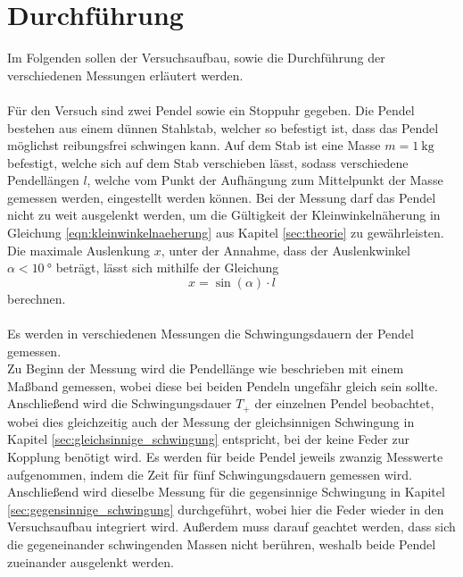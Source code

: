 \section{Durchführung}

    Im Folgenden sollen der Versuchsaufbau, 
    sowie die Durchführung der verschiedenen Messungen erläutert werden.\\
    \\
    Für den Versuch sind zwei Pendel sowie ein Stoppuhr gegeben.
    Die Pendel bestehen aus einem dünnen Stahlstab,
    welcher so befestigt ist,
    dass das Pendel möglichst reibungsfrei schwingen kann.
    Auf dem Stab ist eine Masse $m = \SI{1}{\kilo\gram}$ befestigt,
    welche sich auf dem Stab verschieben lässt,
    sodass verschiedene Pendellängen $l$,
    welche vom Punkt der Aufhängung zum Mittelpunkt der Masse gemessen werden,
    eingestellt werden können.
    Bei der Messung darf das Pendel nicht zu weit ausgelenkt werden,
    um die Gültigkeit der Kleinwinkelnäherung in Gleichung \eqref{eqn:kleinwinkelnaeherung} aus Kapitel \ref{sec:theorie} zu gewährleisten.
    Die maximale Auslenkung $x$,
    unter der Annahme,
    dass der Auslenkwinkel $\alpha < \SI{10}{\degree}$ beträgt,
    lässt sich mithilfe der Gleichung
    \begin{equation}
        x = \sin{(\alpha)} \cdot l
    \end{equation}
    berechnen.\\
    \\
    Es werden in verschiedenen Messungen die Schwingungsdauern der Pendel gemessen.\\
    Zu Beginn der Messung wird die Pendellänge wie beschrieben mit einem Maßband gemessen,
    wobei diese bei beiden Pendeln ungefähr gleich sein sollte.
    Anschließend wird die Schwingungsdauer $T_+$ der einzelnen Pendel beobachtet,
    wobei dies gleichzeitig auch der Messung der gleichsinnigen Schwingung in Kapitel \ref{sec:gleichsinnige_schwingung} entspricht,
    bei der keine Feder zur Kopplung benötigt wird.
    Es werden für beide Pendel jeweils zwanzig Messwerte aufgenommen,
    indem die Zeit für fünf Schwingungsdauern gemessen wird.\\
    Anschließend wird dieselbe Messung für die gegensinnige Schwingung in Kapitel \ref{sec:gegensinnige_schwingung} durchgeführt,
    wobei hier die Feder wieder in den Versuchsaufbau integriert wird.
    Außerdem muss darauf geachtet werden,
    dass sich die gegeneinander schwingenden Massen nicht berühren,
    weshalb beide Pendel zueinander ausgelenkt werden.
